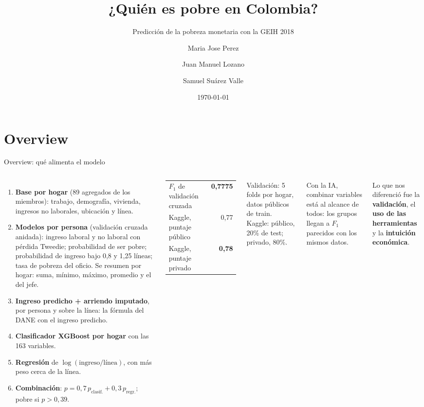 \documentclass[aspectratio=169,10pt]{beamer}
\title{¿Quién es pobre en Colombia?}
\subtitle{Predicción de la pobreza monetaria con la GEIH 2018}
\author{Maria Jose Perez \and Juan Manuel Lozano \and Samuel Suárez Valle}
\institute{Big Data y Machine Learning Aplicado a la Economía \\ Universidad de los Andes}
\date{\today}
\newcommand{\tema}[1]{\textbf{#1}}
\begin{document}
\maketitle

\section{Overview}

\begin{frame}{Overview: qué alimenta el modelo}
\begin{columns}[T]
\scriptsize
\begin{enumerate}\setlength{\itemsep}{1.5pt}
  \item \tema{Base por hogar} (89 agregados de los miembros): trabajo,
    demografía, vivienda, ingresos no laborales, ubicación y línea.
  \item \tema{Modelos por persona} (validación cruzada anidada): ingreso
    laboral y no laboral con pérdida Tweedie; probabilidad de ser pobre;
    probabilidad de ingreso bajo 0,8 y 1,25 líneas; tasa de pobreza del
    oficio. Se resumen por hogar: suma, mínimo, máximo, promedio y el del
    jefe.
  \item \tema{Ingreso predicho + arriendo imputado}, por persona y sobre la
    línea: la fórmula del DANE con el ingreso predicho.
  \item \tema{Clasificador XGBoost por hogar} con las 163 variables.
  \item \tema{Regresión} de $\log(\text{ingreso}/\text{línea})$, con más peso
    cerca de la línea.
  \item \tema{Combinación}: $p = 0{,}7\,p_{\text{clasif.}} + 0{,}3\,p_{\text{regr.}}$;
    pobre si $p > 0{,}39$.
\end{enumerate}

\small
\begin{tabular}{@{}lr@{}}
\toprule
$F_1$ de validación cruzada & \textbf{0,7775} \\
Kaggle, puntaje público & 0,77 \\
Kaggle, puntaje privado & \textbf{0,78} \\
\bottomrule
\end{tabular}

\vspace{1mm}
{\scriptsize Validación: 5 folds por hogar, datos públicos de train.
Kaggle: público, 20\% de test; privado, 80\%.}

\vspace{6mm}
Con la IA, combinar variables está al alcance de todos: los grupos llegan a
$F_1$ parecidos con los mismos datos.

\vspace{2mm}
Lo que nos diferenció fue la \textbf{validación}, el \textbf{uso de las
herramientas} y la \textbf{intuición económica}.
\end{columns}
\end{frame}
\end{document}
